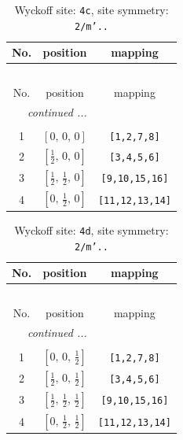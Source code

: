 \documentclass[fleqn,8pt]{jsarticle}
\begin{document}
\renewcommand{\arraystretch}{1.2}
\begin{longtable}{ccc}
\caption{Wyckoff site: {\tt 4c}, site symmetry: {\tt 2/m'..}}
 \\
 \hline \hline
No. & position & mapping \\ \hline \endfirsthead

\multicolumn{2}{l}{\tablename\ \thetable{}} \\
 \hline \hline
No. & position & mapping \\ \hline \endhead

 \hline \hline
\multicolumn{2}{r}{\footnotesize\it continued ...} \\ \endfoot

 \hline \hline
\multicolumn{2}{r}{} \\ \endlastfoot

1 & $\left[ 0,\, 0,\, 0 \right]$ & {\tt [1,2,7,8]} \\ \hline
2 & $\left[ \frac{1}{2},\, 0,\, 0 \right]$ & {\tt [3,4,5,6]} \\ \hline
3 & $\left[ \frac{1}{2},\, \frac{1}{2},\, 0 \right]$ & {\tt [9,10,15,16]} \\ \hline
4 & $\left[ 0,\, \frac{1}{2},\, 0 \right]$ & {\tt [11,12,13,14]} \\
\end{longtable}
\renewcommand{\arraystretch}{1.2}
\begin{longtable}{ccc}
\caption{Wyckoff site: {\tt 4d}, site symmetry: {\tt 2/m'..}}
 \\
 \hline \hline
No. & position & mapping \\ \hline \endfirsthead

\multicolumn{2}{l}{\tablename\ \thetable{}} \\
 \hline \hline
No. & position & mapping \\ \hline \endhead

 \hline \hline
\multicolumn{2}{r}{\footnotesize\it continued ...} \\ \endfoot

 \hline \hline
\multicolumn{2}{r}{} \\ \endlastfoot

1 & $\left[ 0,\, 0,\, \frac{1}{2} \right]$ & {\tt [1,2,7,8]} \\ \hline
2 & $\left[ \frac{1}{2},\, 0,\, \frac{1}{2} \right]$ & {\tt [3,4,5,6]} \\ \hline
3 & $\left[ \frac{1}{2},\, \frac{1}{2},\, \frac{1}{2} \right]$ & {\tt [9,10,15,16]} \\ \hline
4 & $\left[ 0,\, \frac{1}{2},\, \frac{1}{2} \right]$ & {\tt [11,12,13,14]} \\
\end{longtable}
\end{document}
